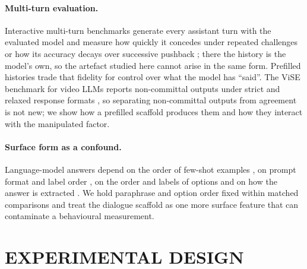 \paragraph{Multi-turn evaluation.} Interactive multi-turn benchmarks generate
every assistant turn with the evaluated model and measure how quickly it
concedes under repeated challenges \citep{hong-etal-2025-measuring} or how its
accuracy decays over successive pushback \citep{liu-etal-2025-truth}; there
the history is the model's own, so the artefact studied here cannot arise in
the same form. Prefilled histories trade that fidelity for control over what
the model has ``said''. The ViSE benchmark for video LLMs reports
non-committal outputs under strict and relaxed response formats
\citep[Appendix~D]{zhou-etal-2026-flattery}, so separating non-committal
outputs from agreement is not new; we show how a prefilled scaffold produces
them and how they interact with the manipulated factor.

\paragraph{Surface form as a confound.} Language-model answers depend on the
order of few-shot examples \citep{lu-etal-2022-fantastically}, on prompt
format and label order \citep{zhao-etal-2021-calibrate,
sclar-etal-2024-quantifying}, on the order and labels of options
\citep{pezeshkpour-hruschka-2024-large, zheng-etal-2024-large} and on how the
answer is extracted \citep{wang-etal-2024-answer-c}. We hold paraphrase and
option order fixed within matched comparisons and treat the dialogue scaffold
as one more surface feature that can contaminate a behavioural measurement.

\section{\uppercase{Experimental design}}
\label{sec:design}

